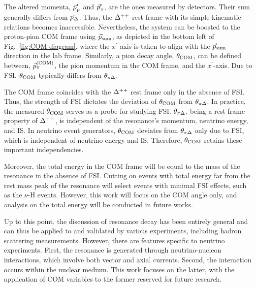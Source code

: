           The altered momenta, $\vec{p}_\textrm{p}^{\prime}$ and $\vec{p}_{\pi}^{\prime}$, are the ones measured by detectors. 
          Their sum generally differs from $\vec{p}_{\Delta}$.
          Thus, the $\Delta^{++}$ rest frame with its simple kinematic relations becomes inaccessible.
          Nevertheless, the system can be boosted to the proton-pion COM frame using $\vec{p}_{\textrm{sum}}$, as depicted in the bottom left of Fig.~\ref{fig:COM-diagram}, where the $x^{\prime}$-axis is taken to align with the $\vec{p}_{\textrm{sum}}$ direction in the lab frame.
          Similarly, a pion decay angle, $\theta_{\textrm{COM}}$, can be defined between, $\vec{p}_{\pi}^{(\textrm{COM})}$, the pion momentum in the COM frame, and the $x^{\prime}$-axis.
          Due to FSI, $\theta_{\textrm{COM}}$ typically differs from $\theta_{\pi\Delta}$. 

          The COM frame coincides with the $\Delta^{++}$ rest frame only in the absence of FSI.
          Thus, the strength of FSI dictates the deviation of $\theta_{\textrm{COM}}$ from $\theta_{\pi\Delta}$. 
          In practice, the measured $\theta_{\textrm{COM}}$ serves as a probe for studying FSI. 
          $\theta_{\pi\Delta}$, being a rest-frame property of $\Delta^{++}$, is independent of the resonance's momentum, neutrino energy, and IS.
          In neutrino event generators, $\theta_{\textrm{COM}}$ deviates from $\theta_{\pi\Delta}$ only due to FSI, which is independent of neutrino energy and IS.
          Therefore, $\theta_{\textrm{COM}}$ retains these important independencies.

          Moreover, the total energy in the COM frame will be equal to the mass of the resonance in the absence of FSI.
          Cutting on events with total energy far from the rest mass peak of the resonance will select events with minimal FSI effects, such as the $\nu$-H events. 
          However, this work will focus on the COM angle only, and analysis on the total energy will be conducted in future works.

          Up to this point, the discussion of resonance decay has been entirely general and can thus be applied to and validated by various experiments, including hadron scattering measurements. 
          However, there are features specific to neutrino experiments. 
          First, the resonance is generated through neutrino-nucleon interactions, which involve both vector and axial currents. 
          Second, the interaction occurs within the nuclear medium. 
          This work focuses on the latter, with the application of COM variables to the former reserved for future research.

